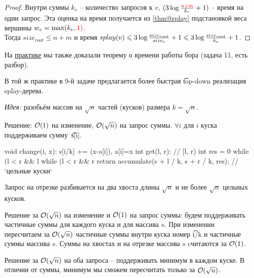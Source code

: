\vspace*{-1.0em}
\begin{proof}
Внутри суммы $k_v$ -- количество запросов к $v$, $(3\log{\textstyle\frac{{\color{red}{n{+}m}}}{k_v}} + 1)$ -- время на один запрос.
Эта оценка на время получается из \autoref{thm@splay} подстановкой веса вершины $w_v = \max(k_v{\color{red}{, 1)}}$.\\
Тогда $size_{root} \le n{+}m$ и время $splay(v) \leqslant 3\log{\textstyle\frac{size_{root}}{size_v}} + 1 \leqslant 3\log{\textstyle\frac{size_{root}}{k_v}} + 1$.
\end{proof}

На \href{http://acm.math.spbu.ru/~sk1/courses/1617s_au/practice/170504.pdf}{практике} 
мы также доказали теорему о времени работы бора (задача 11, есть разбор).

\down
В той ж практике в 9-й задаче предлагается более быстрая \t{top-down} реализация splay-дерева.

\down
{}

\up
{}

{\it Идея:} разобьём массив на $\sqrt{n}$ частей (кусков) размера $k=\sqrt{n}$.


Решение: $\mathcal{O}(1)$ на изменение, $\mathcal{O}(\sqrt{n})$ на запрос суммы.
$\forall i$ для $i$ куска поддерживаем сумму~\t{s[i]}.
\begin{code}
void change(i, x):
	s[i/k] += (x-a[i]), a[i]=x
int get(l, r): // [l, r)
	int res = 0
	while (l < r && l %
	while (l < r && r %
	return accumulate(s + l / k, s + r / k, res); // `цельные куски`
\end{code}
Запрос на отрезке разбивается на два хвоста длины $\sqrt{n}$ и не более $\sqrt{n}$ цельных кусков.

\down
Решение за $\mathcal{O}(\sqrt{n})$ на изменение и $\mathcal{O}(1)$ на запрос суммы:
будем поддерживать частичные суммы для каждого куска и для массива $s$.
При изменении пересчитаем за $\mathcal{O}(\sqrt{n})$ частичные суммы внутри куска номер \t{i/k}
и частичные суммы массива $s$. Суммы на хвостах и на отрезке массива $s$ cчитаются за $\mathcal{O}(1)$.


Решение за $\mathcal{O}(\sqrt{n})$ на оба запроса -- поддерживать минимум в каждом куске.
В отличии от суммы, минимум мы сможем пересчитать только за $\mathcal{O}(\sqrt{n})$.


